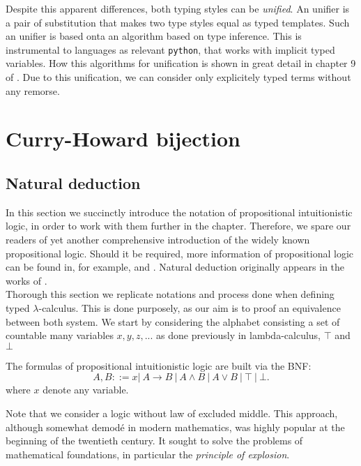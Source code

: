 Despite this apparent differences, both typing styles can be \emph{unified}. An unifier is a pair of substitution that makes two type styles equal as typed templates. Such an unifier is based onta an algorithm based on type inference. This is instrumental to languages  as relevant \texttt{python}, that works with implicit typed variables. How this algorithms for unification is shown in great detail in chapter 9  of \cite{selinger2008lecture}. Due to this unification, we can consider only explicitely typed terms without any remorse.

\section{Curry-Howard bijection}
\subsection{Natural deduction}
In this section we succinctly introduce the notation of propositional intuitionistic logic, in order to work with them further in the chapter. Therefore, we spare our readers of yet another comprehensive introduction of the widely known propositional logic. Should it be required, more information of propositional logic can be found in, for example, \cite{marek2009introduction} and \cite{wadler2015propositions}. Natural deduction originally appears in the works of \cite{gentzen1935untersuchungen}. \\

Thorough this section we replicate notations and process done when defining typed $\lambda$-calculus. This is done purposely, as our aim is to proof an equivalence between both system. We start by considering the alphabet consisting a set of countable many variables $x,y,z,...$ as done previously in lambda-calculus, $\top$ and $\bot$ 

\begin{definition}
  The formulas of propositional intuitionistic logic are built via the BNF:
  $$A,B ::= x |\ A\to B\ |\ A \land B \ |\ A \lor B \ |\ \top \ |\ \bot .$$
  where $x$ denote any variable.
\end{definition}


Note that we consider a logic without law of excluded middle. This approach, although somewhat demodé in modern mathematics, was highly popular at the beginning of the twentieth century. It sought to solve the problems of mathematical foundations, in particular the \emph{principle of explosion}. \\

